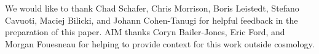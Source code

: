 \documentclass[\docopts]{\docclass}
\begin{document}


We would like to thank Chad Schafer, Chris Morrison, Boris Leistedt, Stefano 
Cavuoti, Maciej Bilicki, and Johann Cohen-Tanugi for helpful feedback in the 
preparation of this paper.
AIM thanks Coryn Bailer-Jones, Eric Ford, and Morgan Fouesneau for helping to 
provide context for this work outside cosmology.





\end{document}
